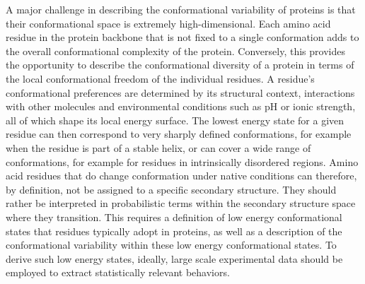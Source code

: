 A major challenge in describing the conformational variability of proteins is that their conformational space is extremely high-dimensional. Each amino acid residue in the protein backbone that is not fixed to a single conformation adds to the overall conformational complexity of the protein. Conversely, this provides the opportunity to describe the conformational diversity of a protein in terms of the local conformational freedom of the individual residues.
A residue's conformational preferences are determined by its structural context, interactions with other molecules and environmental conditions such as pH or ionic strength, all of which shape its local energy surface. The lowest energy state for a given residue can then correspond to very sharply defined conformations, for example when the residue is part of a stable helix, or can cover a wide range of conformations, for example for residues in intrinsically disordered regions. Amino acid residues that do change conformation under native conditions can therefore, by definition, not be assigned to a specific secondary structure. They should rather be interpreted in probabilistic terms within the secondary structure space where they transition. This requires a definition of low energy conformational states that residues typically adopt in proteins, as well as a description of the conformational variability within these low energy conformational states. To derive such low energy states, ideally, large scale experimental data should be employed to extract statistically relevant behaviors.

